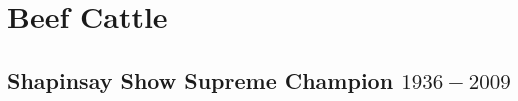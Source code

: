 \chapter{Beef Cattle}
\section[Supreme Champion]{Shapinsay Show Supreme Champion $1936 - 2009$}
\small

\normalsize

